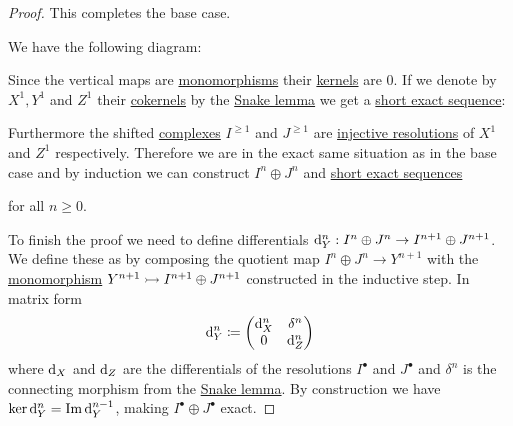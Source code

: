 \documentclass[../../main]{subfiles}
\begin{document}
\begin{proof}
  This completes the base case.

  We have the following diagram:
  \begin{center}
  \end{center}
  Since the vertical maps are \hyperref[def:mono-epi-morphism]{monomorphisms} their \hyperref[def:categorical-kernel]{kernels} are 0.
  If we denote by \(X^{1}, Y^{1}\) and \(Z^{1}\) their \hyperref[def:categorical-cokernel]{cokernels} by the \hyperref[lemma:snake-lemma]{Snake lemma} we get a \hyperref[def:exact-sequence]{short exact sequence}:
  \begin{center}
  \end{center}
  Furthermore the shifted \hyperref[def:complex]{complexes} \(I^{\geq 1}\) and \(J^{\geq 1}\) are \hyperref[def:resolution]{injective resolutions} of \(X^{1}\) and \(Z^{1}\) respectively.
  Therefore we are in the exact same situation as in the base case and by induction we can construct \(I^{n} \oplus J^{n}\) and \hyperref[def:exact-sequence]{short exact sequences}
  \begin{center}
  \end{center}
  for all \(n \geq 0\).

  To finish the proof we need to define differentials \(\mathrm{d}_{Y}^{n}: I^{n} \oplus J^{n} \to I^{n+1} \oplus J^{n+1}\).
  We define these as by composing the quotient map \(I^{n} \oplus J^{n} \to Y^{n+1}\) with the \hyperref[def:mono-epi-morphism]{monomorphism} \(Y^{n+1} \rightarrowtail I^{n+1} \oplus J^{n+1}\) constructed in the inductive step.
  In matrix form
  \begin{equation*}
    \mathrm{d}_{Y}^{n} \coloneq \begin{pmatrix}
      \mathrm{d}_{X}^{n} & \delta^{n} \\
      0 & \mathrm{d}_{Z}^{n}
    \end{pmatrix}
  \end{equation*}
  where \(\mathrm{d}_{X}\) and \(\mathrm{d}_{Z}\) are the differentials of the resolutions \(I^{\bullet}\) and \(J^{\bullet}\) and \(\delta^{n}\) is the connecting morphism from the \hyperref[lemma:snake-lemma]{Snake lemma}.
  By construction we have \(\ker \mathrm{d}_{Y}^{n} = \operatorname{Im} \mathrm{d}_{Y}^{n-1}\), making \(I^{\bullet} \oplus J^{\bullet}\) exact.
\end{proof}
\end{document}
